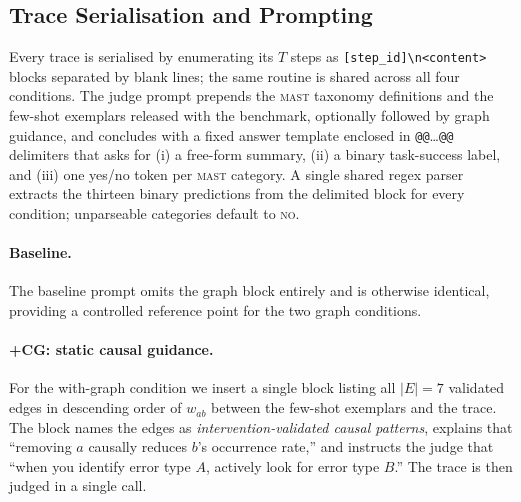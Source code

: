 \subsection{Trace Serialisation and Prompting}
\label{ssec:prompting}

Every trace is serialised by enumerating its $T$ steps as
\texttt{[step\_id]\textbackslash n<content>} blocks separated by blank
lines; the same routine is shared across all four conditions. The judge
prompt prepends the \textsc{mast} taxonomy definitions and the few-shot
exemplars released with the benchmark, optionally followed by graph
guidance, and concludes with a fixed answer template enclosed in
\texttt{@@}\ldots\texttt{@@} delimiters that asks for (i) a free-form
summary, (ii) a binary task-success label, and (iii) one yes/no token per
\textsc{mast} category. A single shared regex parser extracts the thirteen
binary predictions from the delimited block for every condition;
unparseable categories default to \textsc{no}.

\paragraph{Baseline.} The baseline prompt omits the graph block entirely
and is otherwise identical, providing a controlled reference point for the
two graph conditions.

\paragraph{\textsc{+CG}: static causal guidance.} For the with-graph
condition we insert a single block listing all $|E|=7$ validated edges in
descending order of $w_{ab}$ between the few-shot exemplars and the trace.
The block names the edges as \emph{intervention-validated causal patterns},
explains that ``removing $a$ causally reduces $b$'s occurrence rate,'' and
instructs the judge that ``when you identify error type $A$, actively look
for error type $B$.'' The trace is then judged in a single call.

